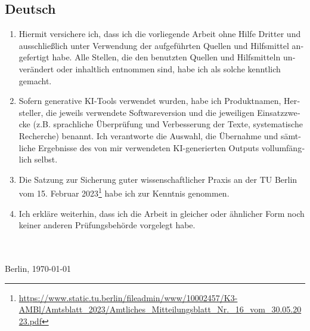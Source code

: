 {\begin{otherlanguage}{ngerman}
\section*{Deutsch}
\begin{enumerate}[noitemsep]
\item Hiermit versichere ich, dass ich die vorliegende Arbeit ohne Hilfe Dritter und ausschließlich unter Verwendung der aufgeführten Quellen und Hilfsmittel angefertigt habe. Alle Stellen, die den benutzten Quellen und Hilfsmitteln unverändert oder inhaltlich entnommen sind, habe ich als solche kenntlich gemacht.
\item Sofern generative KI-Tools verwendet wurden, habe ich Produktnamen, Hersteller, die jeweils verwendete Softwareversion und die jeweiligen Einsatzzwecke (z.B. sprachliche Überprüfung und Verbesserung der Texte, systematische Recherche) benannt. Ich verantworte die Auswahl, die Übernahme und sämtliche Ergebnisse des von mir verwendeten KI-generierten Outputs vollumfänglich selbst.
\item Die Satzung zur Sicherung guter wissenschaftlicher Praxis an der TU Berlin vom 15. Februar 2023\footnote{\url{https://www.static.tu.berlin/fileadmin/www/10002457/K3-AMBl/Amtsblatt_2023/Amtliches_Mitteilungsblatt_Nr._16_vom_30.05.2023.pdf}} habe ich zur Kenntnis genommen.
\item Ich erkläre weiterhin, dass ich die Arbeit in gleicher oder ähnlicher Form noch keiner anderen Prüfungsbehörde vorgelegt habe.
\end{enumerate}
\vspace*{4ex}
\makebox[3in][l]{\hrulefill}\\
\textsc{\autor} \\
Berlin, \today 
\end{otherlanguage}
\pagebreak
\begin{otherlanguage}{english}

\end{otherlanguage}}
